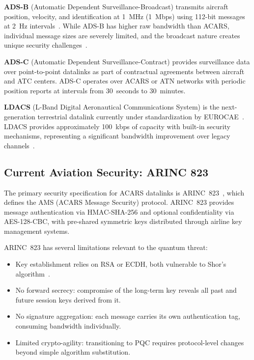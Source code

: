 \documentclass[conference,10pt]{IEEEtran}
\begin{document}
\textbf{ADS-B} (Automatic Dependent Surveillance-Broadcast) transmits aircraft position, velocity, and identification at 1~MHz (1~Mbps) using 112-bit messages at 2~Hz intervals~\cite{do350a}. While ADS-B has higher raw bandwidth than ACARS, individual message sizes are severely limited, and the broadcast nature creates unique security challenges~\cite{strohmeier2015security}.

\textbf{ADS-C} (Automatic Dependent Surveillance-Contract) provides surveillance data over point-to-point datalinks as part of contractual agreements between aircraft and ATC centers. ADS-C operates over ACARS or ATN networks with periodic position reports at intervals from 30~seconds to 30~minutes.

\textbf{LDACS} (L-Band Digital Aeronautical Communications System) is the next-generation terrestrial datalink currently under standardization by EUROCAE~\cite{ed154, ed228}. LDACS provides approximately 100~kbps of capacity with built-in security mechanisms, representing a significant bandwidth improvement over legacy channels~\cite{maeurer2021ldacs}.

\subsection{Current Aviation Security: ARINC 823}

The primary security specification for ACARS datalinks is ARINC~823~\cite{arinc823}, which defines the AMS (ACARS Message Security) protocol. ARINC~823 provides message authentication via HMAC-SHA-256 and optional confidentiality via AES-128-CBC, with pre-shared symmetric keys distributed through airline key management systems.

ARINC~823 has several limitations relevant to the quantum threat:
\begin{itemize}
    \item Key establishment relies on RSA or ECDH, both vulnerable to Shor's algorithm~\cite{shor1997polynomial}.
    \item No forward secrecy: compromise of the long-term key reveals all past and future session keys derived from it.
    \item No signature aggregation: each message carries its own authentication tag, consuming bandwidth individually.
    \item Limited crypto-agility: transitioning to PQC requires protocol-level changes beyond simple algorithm substitution.
\end{itemize}
\end{document}
